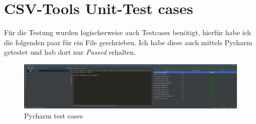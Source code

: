 \section{CSV-Tools Unit-Test cases}
\label{sec:Testcases}

Für die Testung wurden logischerweise auch Testcases benötigt, hierfür habe ich die folgenden paar für ein File geschrieben. Ich habe diese auch mittels Pycharm getestet und hab dort nur \textit{Passed} erhalten.


\begin{figure}[h!]
	\caption{Pycharm test cases}
	\centering
	\includegraphics[width=\textwidth]{images/pycharm_testCases.png}
\end{figure}
\clearpage

